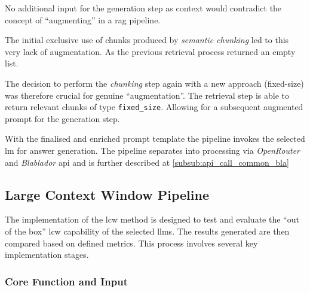No additional input for the generation step as context would contradict the concept of \enquote{augmenting} in a \ac{rag} pipeline.

The initial exclusive use of chunks produced by \textit{semantic chunking} led to this very lack of augmentation.
As the previous retrieval process returned an empty list.

The decision to perform the \textit{chunking} step again with a new approach (fixed-size) was therefore crucial for genuine \enquote{augmentation}.
The retrieval step is able to return relevant chunks of type \texttt{fixed\_size}.
Allowing for a subsequent augmented prompt for the generation step.
%

With the finalised and enriched prompt template the pipeline invokes the selected \ac{lm} for answer generation.
The pipeline separates into processing via \textit{OpenRouter} and \textit{Blablador} \ac{api} and is further described at \cref{subsub:api_call_common_bla}
%
\subsection{Large Context Window Pipeline}

The implementation of the \ac{lcw} method is designed to test and evaluate the \enquote{out of the box} \ac{lcw} capability of the selected \acp{llm}.
The results generated are then compared based on defined metrics.
This process involves several key implementation stages.
%
\subsubsection{Core Function and Input}

